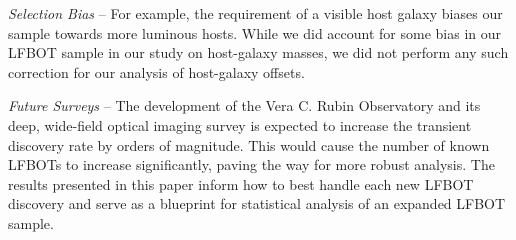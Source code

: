 \documentclass[twocolumn,twocolappendix, linenumbers, trackchanges]{aastex7}
\begin{document}
{\em Selection Bias} --   For example, the requirement of a visible host galaxy biases our sample towards more luminous hosts.  %
While we did account for some bias in our LFBOT sample in our study on host-galaxy masses, we did not perform any such correction for our analysis of host-galaxy offsets. %

\emph{Future Surveys} -- The development of the Vera C. Rubin Observatory \citep{lsst} and its deep, wide-field optical imaging survey is expected to increase the transient discovery rate by orders of magnitude. This would cause the number of known LFBOTs to increase significantly, paving the way for more robust analysis. The results presented in this paper inform how to best handle each new LFBOT discovery and serve as a blueprint for statistical analysis of an expanded LFBOT sample. 
\end{document}
